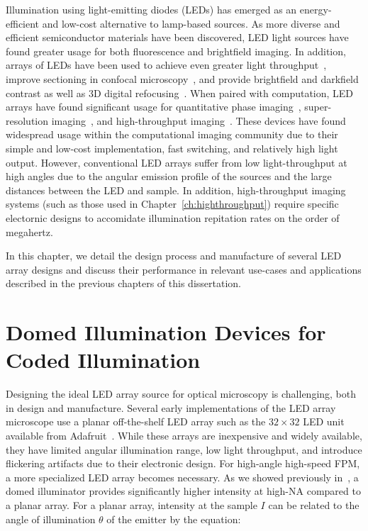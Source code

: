 Illumination using light-emitting diodes (LEDs) has emerged as an energy-efficient and low-cost alternative to lamp-based sources. As more diverse and efficient semiconductor materials have been discovered, LED light sources have found greater usage for both fluorescence and brightfield imaging. In addition, arrays of LEDs have been used to achieve even greater light throughput~\cite{albeanu2008led}, improve sectioning in confocal microscopy~\cite{poher2007optical}, and provide brightfield and darkfield contrast as well as 3D digital refocusing~\cite{Zheng2011}. When paired with computation, LED arrays have found significant usage for quantitative phase imaging~\cite{tian2015quantitative, phillips2015multi, chen2018quantitative}, super-resolution imaging~\cite{Zheng2013, Tian2014}, and high-throughput imaging~\cite{Ma:15}. These devices have found widespread usage within the computational imaging community due to their simple and low-cost implementation, fast switching, and relatively high light output. However, conventional LED arrays suffer from low light-throughput at high angles due to the angular emission profile of the sources and the large distances between the LED and sample. In addition, high-throughput imaging systems (such as those used in Chapter~\ref{ch:highthroughput}) require specific electornic designs to accomidate illumination repitation rates on the order of megahertz.

In this chapter, we detail the design process and manufacture of several LED array designs and discuss their performance in relevant use-cases and applications described in the previous chapters of this dissertation.

\section{Domed Illumination Devices for Coded Illumination}

Designing the ideal LED array source for optical microscopy is challenging, both in design and manufacture. Several early implementations of the LED array microscope use a planar off-the-shelf LED array such as the $32\times 32$ LED unit available from Adafruit~\cite{Zheng2013, Zheng2011}. While these arrays are inexpensive and widely available, they have limited angular illumination range, low light throughput, and introduce flickering artifacts due to their electronic design. For high-angle high-speed FPM, a more specialized LED array becomes necessary. As we showed previously in~\cite{phillips2015multi, Dominguez:14}, a domed illuminator provides significantly higher intensity at high-NA compared to a planar array. For a planar array, intensity at the sample $I$ can be related to the angle of illumination $\theta$ of the emitter by the equation:

